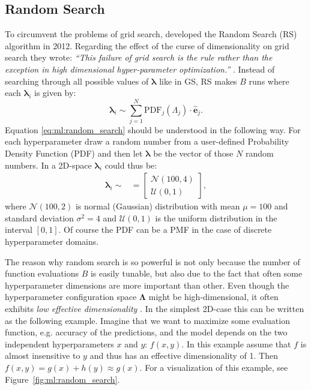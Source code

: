 \documentclass[a4paper, twoside, nobib]{tufte-book}
\newcommand{\autocite}[1]{\citep{#1}}
\begin{document}
\subsection{Random Search}
\label{subsec:ml:random_search}

To circumvent the problems of grid search, \citet{bergstraRandomSearchHyperparameter2012} developed the Random Search (RS) algorithm in 2012. Regarding the effect of the curse of dimensionality on grid search they wrote: \emph{``This failure of grid search is the rule rather than the exception in high dimensional hyper-parameter optimization.''} \citep{bergstraRandomSearchHyperparameter2012}. Instead of searching through all possible values of $\bm{\lambda}$ like in GS, RS makes $B$ runs where each $\bm{\lambda}_i$ is given by:
\begin{equation}
  \label{eq:ml:random_search}
  \bm{\lambda}_i \sim \sum_{j=1}^N  \mathrm{PDF}_j(\Lambda_j) \cdot \bm{\hat{e}}_j  .
\end{equation}
Equation \eqref{eq:ml:random_search} should be understood in the following way. For each hyperparameter draw a random number from a user-defined Probability Density Function (PDF) and then let $\bm{\lambda}$ be the vector of those $N$ random numbers. In a 2D-space $\bm{\lambda}_i$ could thus be: 
\begin{align}
  \bm{\lambda}_i \sim &= \begin{bmatrix}
      \mathcal{N}(100, 4) \\
      \mathcal{U}(0, 1)
       \end{bmatrix},
\end{align}
where $\mathcal{N}(100, 2)$ is normal (Gaussian) distribution with mean $\mu=100$ and standard deviation $\sigma^2=4$ and $\mathcal{U}(0, 1)$ is the uniform distribution in the interval $[0, 1]$. Of course the PDF can be a PMF in the case of discrete hyperparameter domains.

The reason why random search is so powerful is not only because the number of function evaluations $B$ is easily tunable, but also due to the fact that often some hyperparameter dimensions are more important than other. Even though the hyperparameter configuration space $\bm{\Lambda}$  might be high-dimensional, it often exhibits \emph{low effective dimensionality} \autocite{bergstraRandomSearchHyperparameter2012}. In the simplest 2D-case this can be written as the following example. Imagine that we want to maximize some evaluation function, e.g. accuracy of the predictions, and the model depends on the two independent hyperparameters $x$ and $y$: $f(x, y)$. In this example assume that $f$ is almost insensitive to $y$ and thus has an effective dimensionality of 1. Then $f(x,y) = g(x) + h(y) \approx g(x)$. For a visualization of this example, see Figure~\ref{fig:ml:random_search}.
\end{document}
